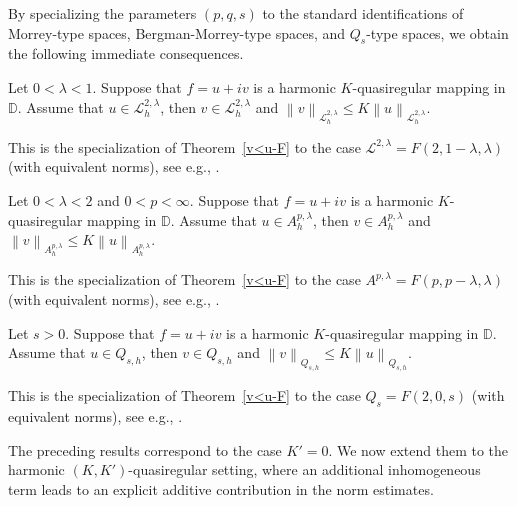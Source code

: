 \documentclass[12pt, reqno]{amsart}
\begin{document}
By specializing the parameters $(p,q,s)$ to the standard identifications of Morrey-type spaces, Bergman-Morrey-type spaces, and $Q_s$-type spaces, we obtain the following immediate consequences.

\begin{coro}\label{coro:morrey-K}
Let $0<\lambda<1$. Suppose that $f=u+iv$ is a harmonic $K$-quasiregular mapping in $\mathbb D$.
Assume that $u\in \mathcal{L}_{h}^{2,\lambda}$,
then $v\in \mathcal{L}_{h}^{2,\lambda}$ and
$\left \|v  \right \| _{\mathcal{L}_{h}^{2,\lambda}}\le K\left \|u  \right \| _{\mathcal{L}_{h}^{2,\lambda}}.$
\smallskip
\end{coro}

\begin{remark} {\rm This is the specialization of Theorem~\ref{v<u-F} to the case
$\mathcal{L}^{2,\lambda}=F(2,1-\lambda,\lambda)$ (with equivalent norms), see e.g., \cite{LL,WJ,ZR,ZR1}.}
\end{remark}

\begin{coro}\label{coro:bergman-morrey-K}
Let $0<\lambda<2$ and $0<p<\infty$. Suppose that $f=u+iv$ is a harmonic $K$-quasiregular mapping in $\mathbb D$.
Assume that $u\in A_{h}^{p,\lambda}$,
then $v\in A_{h}^{p,\lambda}$ and
$\left \|v  \right \| _{A_{h}^{p,\lambda}}\le K\left \|u  \right \| _{A_{h}^{p,\lambda}}.$
\smallskip
\end{coro}

\begin{remark} {\rm This is the specialization of Theorem~\ref{v<u-F} to the case
$A^{p,\lambda}=F(p,p-\lambda,\lambda)$ (with equivalent norms), see e.g., \cite{YL,ZR,ZR1}.}
\end{remark}

\begin{coro}\label{coro:Qs-K}
Let $s>0$. Suppose that $f=u+iv$ is a harmonic $K$-quasiregular mapping in $\mathbb D$.
Assume that $u\in Q_{s,h}$,
then $v\in Q_{s,h}$ and
$\left \|v  \right \| _{Q_{s,h}}\le K\left \|u  \right \| _{Q_{s,h}}.$
\smallskip
\end{coro}

\begin{remark}  {\rm This is the specialization of Theorem~\ref{v<u-F} to the case
$Q_s=F(2,0,s)$ (with equivalent norms), see e.g., \cite{XJ2,ZR,ZR1}.}
\end{remark}

{\rm The preceding results correspond to the case $K'=0$.
We now extend them to the harmonic $(K,K')$-quasiregular setting, where an additional inhomogeneous term leads to an explicit additive contribution in the norm estimates.}
\end{document}
